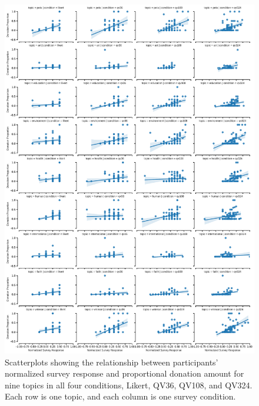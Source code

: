 \begin{figure}[htpb]
    \centering
    \includegraphics[width=\textwidth, keepaspectratio=true]{content/image/vote_donation_covariates.pdf}
    \caption{
      Scatterplots showing the relationship between participants' normalized survey response and proportional donation amount for nine topics in all four conditions, Likert, QV36, QV108, and QV324. Each row is one topic, and each column is one survey condition.
    }
    \label{fig:topic_covariate_exp1}
\end{figure}



